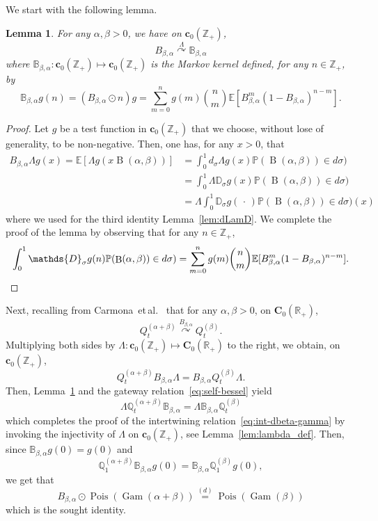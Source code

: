 \documentclass[10pt]{amsart}
\newtheorem{lemm}[theo]{Lemma}\newtheorem{prop}[theo]{Proposition}\newtheorem{coro}[theo]{Corollary}\newtheorem{conj}[theo]{Conjecture}
\theoremstyle{definition}\newtheorem{defi}[theo]{Definition}\newtheorem{rema}[theo]{Remark}\newtheorem{exam}[theo]{Example}\newtheorem{exem}[theo]{Example}\newtheorem{nota}[theo]{Notation}
\DeclareMathOperator{\Pois}{Pois}
\DeclareMathOperator{\Gam}{Gam}
\DeclareMathOperator{\rmB}{B}
\newcommand{\PP}{\mathbb{P}}
\newcommand{\RR}{\mathbb{R}}
\newcommand{\ZZ}{\mathbb{Z}}
\newcommand{\esC}{\mathbf{C}}
\newcommand{\esc}{\mathbf{c}}
\newcommand*\E{{\mathbb E}}
\newcommand{\discret}[1]{\mathds{#1}}
\newcommand{\Gate}[3]{#1\stackrel{#2}{\curvearrowright}#3}
\begin{document}
We start with the following lemma.

\begin{lemm}\label{lem:BLb}
For any $\alpha,\beta>0$, we have on $\esc_0(\ZZ_+)$,
\begin{equation}\label{eq:gatBLb}
\Gate{B_{\beta,\alpha}}{\Lambda}{\discret{B}_{\beta,\alpha}}
\end{equation}
where $\discret{B}_{\beta,\alpha}: \esc_0(\ZZ_+)\mapsto \esc_0(\ZZ_+)$ is the Markov kernel defined, for any $n\in \ZZ_+$, by
\[
\discret{B}_{\beta,\alpha}g(n)=(B_{\beta,\alpha} \odot n) g=\sum_{m=0}^n g(m)\binom{n}{m}\E[B_{\beta,\alpha}^m(1-B_{\beta,\alpha})^{n-m}].
\]
\end{lemm}

\begin{proof}
Let $g$ be a test function in $\esc_0(\ZZ_+)$ that we choose, without lose of generality, to be non-negative. Then, one has, for any $x>0$, that
\begin{align*}
B_{\beta,\alpha} \Lambda g(x)= \E\left[\Lambda g(x \rmB(\alpha,\beta))\right] &= \int_{0}^{1} d_\sigma \Lambda g(x) \PP(\rmB(\alpha,\beta))\in d\sigma) \\
&= \int_{0}^{1} \Lambda \discret{D}_{\sigma} g(x) \PP(\rmB(\alpha,\beta))\in d\sigma)\\
&= \Lambda \int_{0}^{1} \discret{D}_{\sigma} g({\,\cdot\,}) \PP(\rmB(\alpha,\beta))\in d\sigma)(x)
\end{align*}
where we used for the third identity Lemma~\ref{lem:dLamD}. We complete the proof of the lemma by observing that for any $n\in \ZZ_+$,
\[
\int_{0}^{1} \discret{D}_{\sigma} g(n) \PP(\rmB(\alpha,\beta))\in d\sigma)=\sum_{m=0}^n g(m)\binom{n}{m}\E[B_{\beta,\alpha}^m(1-B_{\beta,\alpha})^{n-m}].\qedhere
\]
\end{proof}

Next, recalling from Carmona~et\,al.~\cite{Carmona-Petit-Yor-98} that for any $\alpha,\beta>0$, on $\esC_0(\RR_+)$,
\[
\Gate{Q^{(\alpha+\beta)}_t}{ {{B}}_{\beta,\alpha}}{Q^{(\beta)}_t}.
\]
Multiplying both sides by $\Lambda: \esc_0(\ZZ_+) \mapsto \esC_0(\RR_+)$ to the right, we obtain, on $\esc_0(\ZZ_+)$,
\[
Q^{(\alpha+\beta)}_t{{B}}_{\beta,\alpha}\Lambda = {{B}}_{\beta,\alpha} Q^{(\beta)}_t\Lambda.
\]
Then, Lemma~\ref{lem:BLb} and the gateway relation~\eqref{eq:self-bessel} yield
\[
\Lambda \discret{Q}^{(\alpha+\beta)}_t{\discret{B}}_{\beta,\alpha} = \Lambda {\discret{B}}_{\beta,\alpha} \discret Q^{(\beta)}_t
\]
which completes the proof of the intertwining relation~\eqref{eq:int-dbeta-gamma} by invoking the injectivity of $\Lambda$ on $\esc_0(\ZZ_+)$, see Lemma~\ref{lem:lambda_def}. Then, since ${\discret{B}}_{\beta,\alpha} g(0)=g(0)$ and
\[
\discret{Q}^{(\alpha+\beta)}_1{\discret{B}}_{\beta,\alpha}g(0) = {\discret{B}}_{\beta,\alpha} \discret Q^{(\beta)}_1 g(0),
\]
we get that
\[
B_{\beta,\alpha} \odot\Pois(\Gam(\alpha+\beta))\stackrel{(d)}{=}\Pois(\Gam(\beta))
\]
which is the sought identity.
\end{document}
